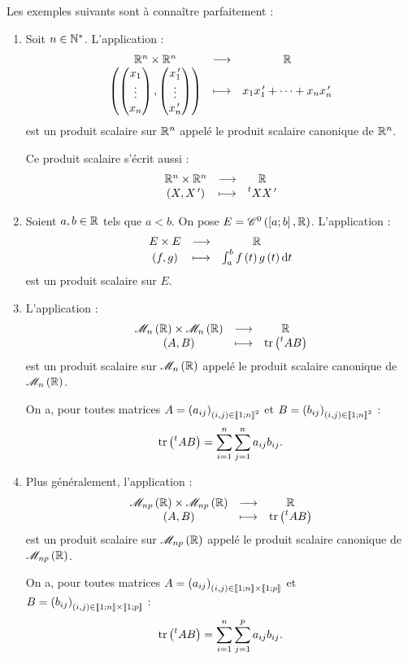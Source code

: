 \begin{ex}
Les exemples suivants sont à connaître parfaitement :

\begin{enumerate}
\item Soit \(n\in\mathbb{N}^*\). L'application : \[\begin{array}[t]{ccc}\mathbb{R}^n\times\mathbb{R}^n & \longrightarrow & \mathbb{R} \\ \left(\begin{pmatrix}x_1\\\vdots\\x_n\end{pmatrix},\begin{pmatrix}x_1^{\,\prime}\\\vdots\\x_n^{\,\prime}\end{pmatrix}\right) & \longmapsto & x_1x_1^{\,\prime}+\dots+x_nx_n^{\,\prime}\end{array}\] est un produit scalaire sur \(\mathbb{R}^n\) appelé le produit scalaire canonique de \(\mathbb{R}^n\).

Ce produit scalaire s'écrit aussi : \[\begin{array}[t]{ccc}\mathbb{R}^n\times\mathbb{R}^n & \longrightarrow & \mathbb{R} \\ \left(X,X^{\,\prime}\right) & \longmapsto & \prescript{t}{}{X}X^{\,\prime}\end{array}\]

\item Soient \(a,b\in\mathbb{R}\) tels que \(a<b\). On pose \(E=\mathscr{C}^{0}\left(\left[a;b\right],\mathbb{R}\right)\). L'application : \[\fonctionlambda{E\times E}{\R}{\paren{f,g}}{\int_a^bf\paren{t}g\paren{t}\odif{t}}\] est un produit scalaire sur \(E\). \\

\item L'application : \[\fonctionlambda{\M{n}[\R]\times\M{n}[\R]}{\R}{\paren{A,B}}{\tr\paren{\trans{A}B}}\] est un produit scalaire sur \(\M{n}[\R]\) appelé le produit scalaire canonique de \(\M{n}[\R]\).

On a, pour toutes matrices \(A=\left(a_{ij}\right)_{\left(i,j\right)\in\left\llbracket1;n\right\rrbracket^2}\) et \(B=\left(b_{ij}\right)_{\left(i,j\right)\in\left\llbracket1;n\right\rrbracket^2}\) : \[\operatorname{tr}\left(\prescript{t}{}{A}B\right)=\sum_{i=1}^n\sum_{j=1}^na_{ij}b_{ij}.\]

\item Plus généralement, l'application : \[\fonctionlambda{\M{np}[\R]\times\M{np}[\R]}{\R}{\paren{A,B}}{\tr\paren{\trans{A}B}}\] est un produit scalaire sur \(\M{np}[\R]\) appelé le produit scalaire canonique de \(\M{np}[\R]\).

On a, pour toutes matrices \(A=\left(a_{ij}\right)_{\left(i,j\right)\in\left\llbracket1;n\right\rrbracket\times\left\llbracket1;p\right\rrbracket}\) et \(B=\left(b_{ij}\right)_{\left(i,j\right)\in\left\llbracket1;n\right\rrbracket\times\left\llbracket1;p\right\rrbracket}\) : \[\operatorname{tr}\left(\prescript{t}{}{A}B\right)=\sum_{i=1}^n\sum_{j=1}^pa_{ij}b_{ij}.\]
\end{enumerate}
\end{ex}

